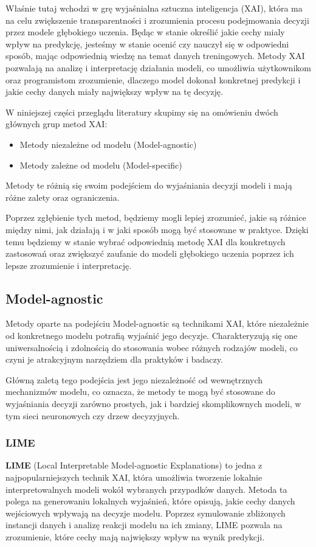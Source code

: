Właśnie tutaj wchodzi w grę wyjaśnialna sztuczna inteligencja (XAI), która ma na celu zwiększenie transparentności i zrozumienia procesu podejmowania decyzji przez modele głębokiego uczenia.
Będąc w stanie określić jakie cechy mialy wpływ na predykcję, jesteśmy w stanie ocenić czy nauczył się w odpowiedni sposób, mając odpowiednią wiedzę na temat danych treningowych.
Metody XAI pozwalają na analizę i interpretację działania modeli, co umożliwia użytkownikom oraz programistom zrozumienie, dlaczego model dokonał konkretnej predykcji i jakie cechy danych miały największy wpływ na tę decyzję.

W niniejszej części przeglądu literatury skupimy się na omówieniu dwóch głównych grup metod XAI: 
\begin{itemize}
  \item Metody niezależne od modelu (Model-agnostic)
  \item Metody zależne od modelu (Model-specific)
\end{itemize}
Metody te różnią się swoim podejściem do wyjaśniania decyzji modeli i mają różne zalety oraz ograniczenia.

Poprzez zgłębienie tych metod, będziemy mogli lepiej zrozumieć, jakie są różnice między nimi, jak działają i w jaki sposób mogą być stosowane w praktyce.
Dzięki temu będziemy w stanie wybrać odpowiednią metodę XAI dla konkretnych zastosowań oraz zwiększyć zaufanie do modeli głębokiego uczenia poprzez ich lepsze zrozumienie i interpretację.

\subsection*{Model-agnostic}
Metody oparte na podejściu Model-agnostic są technikami XAI, które niezależnie od konkretnego modelu potrafią wyjaśnić jego decyzje.
Charakteryzują się one uniwersalnością i zdolnością do stosowania wobec różnych rodzajów modeli, co czyni je atrakcyjnym narzędziem dla praktyków i badaczy.

Główną zaletą tego podejścia jest jego niezależność od wewnętrznych mechanizmów modelu, co oznacza, że metody te mogą być stosowane do wyjaśniania decyzji zarówno prostych, jak i bardziej skomplikownych modeli, w tym sieci neuronowych czy drzew decyzyjnych.

\subsubsection*{LIME}
\textbf{LIME} (Local Interpretable Model-agnostic Explanations) to jedna z najpopularniejszych technik XAI, która umożliwia tworzenie lokalnie interpretowalnych modeli wokół wybranych przypadków danych.
Metoda ta polega na generowaniu lokalnych wyjaśnień, które opisują, jakie cechy danych wejściowych wpływają na decyzje modelu.
Poprzez symulowanie zbliżonych instancji danych i analizę reakcji modelu na ich zmiany, LIME pozwala na zrozumienie, które cechy mają największy wpływ na wynik predykcji.


